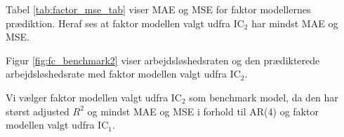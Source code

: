 Tabel \ref{tab:factor_mse_tab} viser MAE og MSE for faktor modellernes prædiktion.
Heraf ses at faktor modellen valgt udfra IC\(_2\) har mindst MAE og MSE.



Figur \ref{fig:fc_benchmark2} viser arbejdsløshedsraten og den prædikterede arbejdsløshedsrate med faktor modellen valgt udfra IC\(_2\).

Vi vælger faktor modellen valgt udfra IC\(_2\) som benchmark model, da den har størst adjusted \(R^2\) og mindst MAE og MSE i forhold til AR(4) og faktor modellen valgt udfra IC\(_1\).

